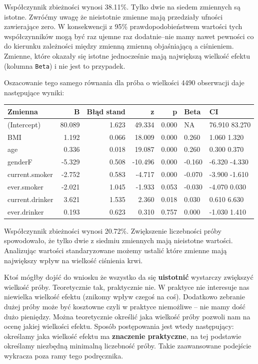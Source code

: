 \documentclass[
  openany]{book}
\begin{document}
\begin{example}
Współczynnik zbieżności wynosi 38.11\%. Tylko dwie na siedem zmiennych
są istotne. Zwróćmy uwagę że nieistotnie zmienne mają przedziały ufności zawierające zero. W konsekwencji
z 95\% prawdopodobieństwem wartości tych współczynników mogą być raz ujemne raz dodatnie--nie mamy
nawet pewności co do kierunku zależności między zmienną zmienną objaśniającą a ciśnieniem.
Zmienne, które okazały się istotne jednocześnie mają największą wielkość efektu (kolumna \texttt{Beta})
i nie jest to przypadek.

Oszacowanie tego samego równania dla próba o wielkości 4490 obserwacji daje następujące
wyniki:

\begin{tabular}{l|r|r|r|r|l|l}
\hline
Zmienna & B & Błąd stand & z & p & Beta & CI\\
\hline
(Intercept) & 80.089 & 1.623 & 49.334 & 0.000 & NA & 76.910 83.270\\
\hline
BMI & 1.192 & 0.066 & 18.009 & 0.000 & 0.260 & 1.060 1.320\\
\hline
age & 0.336 & 0.018 & 19.087 & 0.000 & 0.260 & 0.300 0.370\\
\hline
genderF & -5.329 & 0.508 & -10.496 & 0.000 & -0.160 & -6.320 -4.330\\
\hline
current.smoker & -2.752 & 0.583 & -4.717 & 0.000 & -0.070 & -3.900 -1.610\\
\hline
ever.smoker & -2.021 & 1.045 & -1.933 & 0.053 & -0.030 & -4.070 0.030\\
\hline
current.drinker & 3.621 & 1.535 & 2.360 & 0.018 & 0.030 & 0.610 6.630\\
\hline
ever.drinker & 0.193 & 0.623 & 0.310 & 0.757 & 0.000 & -1.030 1.410\\
\hline
\end{tabular}

Współczynnik zbieżności wynosi 20.72\%. Zwiększenie
liczebności próby spowodowało, że tylko dwie z siedmiu zmiennych
mają nieistotne wartości. Analizując wartości standaryzowane możemy ustalić
które zmienne mają największy wpływ na wielkość ciśnienia krwi.

Ktoś mógłby dojść do wniosku że wszystko da się \textbf{uistotnić}
wystarczy zwiększyć wielkość próby. Teoretycznie tak, praktycznie nie.
W praktyce nie interesuje nas niewielka wielkość
efektu (znikomy wpływ czegoś na coś). Dodatkowo zebranie dużej próby może
być kosztowne czyli w praktyce niemożliwe -- nie mamy dość dużo pieniędzy.
Można teoretycznie określić jaka wielkość próby pozwoli nam na ocenę jakiej
wielkości efektu. Sposób postępowania jest wtedy następujący: określamy
jaka wielkość efektu ma \textbf{znaczenie praktyczne}, na tej podstawie określamy
niezbędną minimalną liczebność próby. Takie zaawansowane podejście
wykracza poza ramy tego podręcznika.
\end{example}
\end{document}
